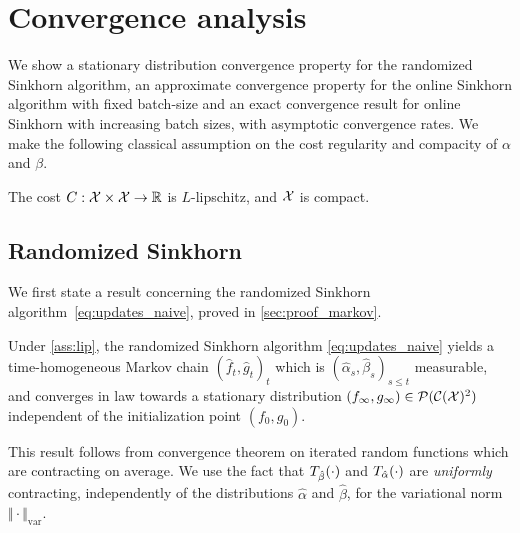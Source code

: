 

\section{Convergence analysis}\label{sec:analysis}

We show a
stationary distribution convergence property for the randomized Sinkhorn algorithm,
 an approximate convergence property for the online Sinkhorn algorithm with
fixed batch-size and an exact convergence result for online Sinkhorn with
increasing batch sizes, with asymptotic convergence rates. We make the following classical assumption on the cost regularity and compacity of $\alpha$ and $\beta$.

\begin{assumption}\label{ass:lip}
    The cost $C: \mathcal{X} \times \mathcal{X} \to \mathbb{R}$ is $L$-lipschitz, and $\mathcal{X}$ is  compact.
\end{assumption}

\subsection{Randomized Sinkhorn}

We first state a result concerning the randomized Sinkhorn algorithm~\eqref{eq:updates_naive}, proved in \autoref{sec:proof_markov}.

\begin{proposition}\label{prop:markov}
    Under \autoref{ass:lip}, the randomized Sinkhorn algorithm \eqref{eq:updates_naive} yields a time-homogeneous
    Markov chain ${(\hat f_t, \hat g_t)}_t$ which is $(\hat \alpha_s, \hat \beta_s)_{s \leq
    t}$ measurable, and converges in law towards a stationary distribution
    $(f_\infty, g_\infty) \in \mathcal{P}(\mathcal{C}(\mathcal{X})^2)$ independent of the initialization
    point $(f_0, g_0)$.
\end{proposition}

This result follows from \citet{diaconis_iterated} convergence theorem on
iterated random functions which are contracting on average. We use the
fact that $T_{\hat \beta}(\cdot)$ and $T_{\hat \alpha}(\cdot)$ are
\textit{uniformly} contracting, independently of the distributions $\hat \alpha$ and
$\hat \beta$, for the variational norm $\Vert \cdot \Vert_{\text{var}}$. 

